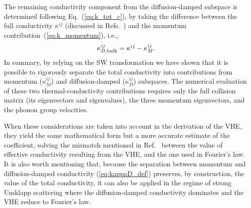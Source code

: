 \documentclass[
prb,
twocolumn,
superscriptaddress,
 amsmath,amssymb,
 aps,
longbibliography,
]{revtex4-2}
\begin{document}
The remaining conductivity component from the diffusion-damped subspace is determined following Eq.~(\ref{eq:k_tot_c}),
by taking the difference between the full conductivity $\kappa^{ij}$ (discussed in Refs.~\cite{cepellotti_thermal_2016,Simoncelli2020}) and the momentum contribution~(\ref{eq:k_momentum}), i.e.,
\begin{equation}
	{\kappa}^{ij}_{D, \rm bulk}={\kappa}^{ij}-\kappa^{ij}_{M}.
	\label{eq:kappaD_def}
\end{equation}
In summary, by relying on the SW transformation we have shown that it is possible to rigorously separate the total conductivity into contributions from momentum ($\kappa^{ij}_{M}$) and diffusion-damped ($\kappa^{ij}_{D}$) subspaces.
The numerical evaluation of these two thermal-conductivity contributions requires only the full collision matrix (its eigenvectors and eigenvalues), the three momentum eigenvectors, and the phonon group velocities.

When these considerations are taken into account in the derivation of the VHE, they yield the same mathematical form but a more accurate estimate of the coefficient, solving the mismatch mentioned in Ref.~\cite{Simoncelli2020} between the value of effective conductivity resulting from the VHE, and the one used in Fourier's law.
It is also worth mentioning that,
because the separation between momentum and diffusion-damped conductivity (\ref{eq:kappaD_def}) preserves, by construction, the value of the total conductivity, it can also be applied in the regime of strong Umklapp scattering where the diffusion-damped conductivity dominates and the VHE reduce to Fourier's law.
\end{document}
